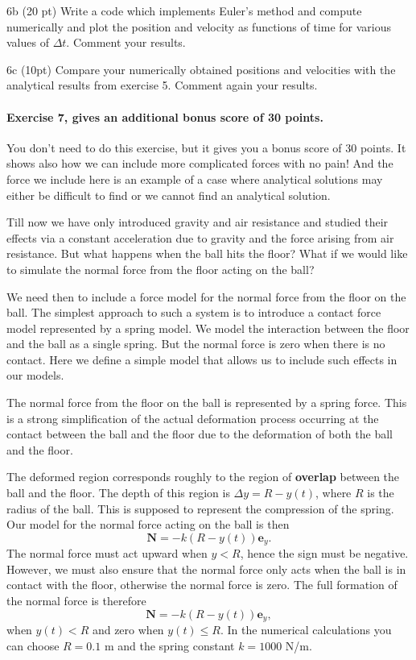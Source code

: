 \documentclass[%
oneside,                 %
final,                   %
10pt]{article}
\begin{document}
\noindent
\item 6b (20 pt) Write a code which implements Euler's method and compute numerically and plot the position and velocity as functions of time for various values of $\Delta t$. Comment your results.



\item 6c (10pt) Compare your numerically obtained positions and velocities with the analytical results from exercise 5. Comment again your results.


\paragraph{Exercise 7, gives an additional bonus score of 30 points.}
You don't need to do this exercise, but it gives you a bonus score of 30 points. It shows also how we can include more complicated forces with no pain! And the force we include here is an example of a case where analytical solutions may either be difficult to find or we cannot find an analytical solution. 


Till now we have only introduced gravity and air resistance and studied
their effects via a constant acceleration due to gravity and the force
arising from air resistance. But what happens when the ball hits the
floor? What if we would like to simulate the normal force from the floor acting on the ball?

We need then to include a force model for the normal force from
the floor on the ball. The simplest approach to such a system is to introduce a contact force
model represented by a spring model.  We model the interaction between the floor
and the ball as a single spring. But the normal force is zero when
there is no contact. Here  we define a simple model that allows us to include
such effects in our models.

The normal force from the floor on the ball is represented by a spring force. This
is a strong simplification of the actual deformation process occurring at the contact
between the ball and the floor due to the deformation of both the ball and the floor.

The deformed region corresponds roughly to the region of \textbf{overlap} between the
ball and the floor. The depth of this region is $\Delta y = R − y(t)$, where $R$
is the radius of the ball. This is supposed to represent the compression of the spring.
Our model for the normal force acting on the ball is then
\[
\bm{N} = −k (R − y(t)) \bm{e}_y. 
\]
The normal force must act upward when $y < R$,
hence the sign must be negative.
However, we must also ensure that the normal force only acts when the ball is in
contact with the floor, otherwise the normal force is zero. The full formation of the
normal force is therefore
\[
\bm{N} = −k (R − y(t)) \bm{e}_y, 
\]
when $y(t) < R$ and zero when $y(t) \le R$.
In the numerical calculations you can choose $R=0.1$ m and the spring constant $k=1000$ N/m.
\end{document}

